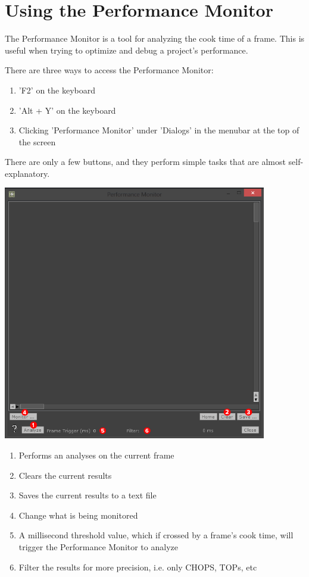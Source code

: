 
\section{Using the Performance Monitor}

\begin{fullwidth}
The Performance Monitor is a tool for analyzing the cook time of a frame. This is useful when trying to optimize and debug a project's performance.

There are three ways to access the Performance Monitor: 

\begin{enumerate}
\item 'F2' on the keyboard
\item 'Alt + Y' on the keyboard
\item Clicking 'Performance Monitor' under 'Dialogs' in the menubar at the top of the screen
\end{enumerate}

There are only a few buttons, and they perform simple tasks that are almost self-explanatory.

\begin{center}
\includegraphics[width=11.5cm]{./img/11.3/performance-monitor-1.png}
\end{center}

\begin{enumerate}
\item Performs an analyses on the current frame
\item Clears the current results
\item Saves the current results to a text file
\item Change what is being monitored
\item A millisecond threshold value, which if crossed by a frame's cook time, will trigger the Performance Monitor to analyze
\item Filter the results for more precision, i.e. only CHOPS, TOPs, etc
\end{enumerate}


\end{fullwidth}
